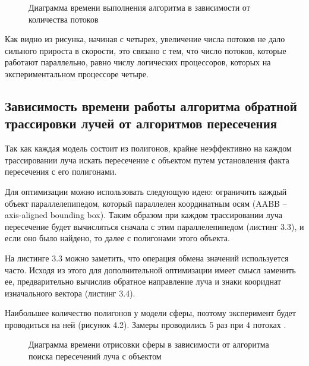\documentclass[12pt,a4paper,oneside]{report}
\begin{document}
	\begin{figure}[h]
		\centering
		\caption{Диаграмма времени выполнения алгоритма в зависимости от количества потоков}
	\end{figure}
	
	 Как видно из рисунка, начиная с четырех, увеличение числа потоков не дало сильного прироста в скорости, это связано с тем, что число потоков, которые  работают параллельно, равно числу логических процессоров, которых на экспериментальном процессоре четыре.
	
	\subsection{Зависимость времени работы алгоритма обратной трассировки лучей от алгоритмов пересечения}
	
	 \quad Так как каждая модель состоит из полигонов, крайне неэффективно на каждом трассировании луча искать пересечение с объектом путем установления факта пересечения с его полигонами.
	
	 Для оптимизации можно использовать следующую идею: ограничить каждый объект параллелепипедом, который параллелен координатным осям (AABB -- axis-aligned bounding box). Таким образом при каждом трассировании луча пересечение будет вычисляться сначала с этим параллелепипедом (листинг 3.3), и если оно было найдено, то далее с полигонами этого объекта. 
	
	 На листинге 3.3 можно заметить, что операция обмена значений используется часто. Исходя из этого для дополнительной оптимизации имеет смысл заменить ее, предварительно вычислив обратное направление луча и знаки коориднат изначального вектора (листинг 3.4).
	
	 Наибольшее количество полигонов у модели сферы, поэтому эксперимент будет проводиться на ней (рисунок 4.2). Замеры проводились 5 раз при 4 потоках .
	
	
	\begin{figure}[h]
		\centering
		\caption{Диаграмма времени отрисовки сферы в зависимости от алгоритма поиска пересечений луча с объектом}
	\end{figure}
	
\end{document}
